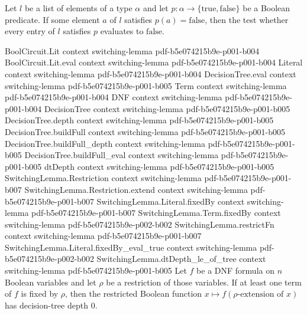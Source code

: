 \begin{lemma}
\label{SwitchingLemma.list_all_eq_false_of_mem}
\leanok
{}
Let $l$ be a list of elements of a type $\alpha$ and let $p \colon \alpha \to
\{\mathrm{true}, \mathrm{false}\}$ be a Boolean predicate. If some element $a$ of $l$
satisfies $p(a) = \mathrm{false}$, then the test whether every entry of $l$ satisfies
$p$ evaluates to $\mathrm{false}$.
\end{lemma}

\begin{lemma}
\label{SwitchingLemma.fixedTerm_implies_dtDepth_zero}
\leanok
{}
\proofstep
  {BoolCircuit.Lit}
  {context}
  {switching-lemma}
  {pdf-b5e074215b9e-p001-b004}
\proofstep
  {BoolCircuit.Lit.eval}
  {context}
  {switching-lemma}
  {pdf-b5e074215b9e-p001-b004}
\proofstep
  {Literal}
  {context}
  {switching-lemma}
  {pdf-b5e074215b9e-p001-b004}
\proofstep
  {DecisionTree.eval}
  {context}
  {switching-lemma}
  {pdf-b5e074215b9e-p001-b005}
\proofstep
  {Term}
  {context}
  {switching-lemma}
  {pdf-b5e074215b9e-p001-b004}
\proofstep
  {DNF}
  {context}
  {switching-lemma}
  {pdf-b5e074215b9e-p001-b004}
\proofstep
  {DecisionTree}
  {context}
  {switching-lemma}
  {pdf-b5e074215b9e-p001-b005}
\proofstep
  {DecisionTree.depth}
  {context}
  {switching-lemma}
  {pdf-b5e074215b9e-p001-b005}
\proofstep
  {DecisionTree.buildFull}
  {context}
  {switching-lemma}
  {pdf-b5e074215b9e-p001-b005}
\proofstep
  {DecisionTree.buildFull_depth}
  {context}
  {switching-lemma}
  {pdf-b5e074215b9e-p001-b005}
\proofstep
  {DecisionTree.buildFull_eval}
  {context}
  {switching-lemma}
  {pdf-b5e074215b9e-p001-b005}
\proofstep
  {dtDepth}
  {context}
  {switching-lemma}
  {pdf-b5e074215b9e-p001-b005}
\proofstep
  {SwitchingLemma.Restriction}
  {context}
  {switching-lemma}
  {pdf-b5e074215b9e-p001-b007}
\proofstep
  {SwitchingLemma.Restriction.extend}
  {context}
  {switching-lemma}
  {pdf-b5e074215b9e-p001-b007}
\proofstep
  {SwitchingLemma.Literal.fixedBy}
  {context}
  {switching-lemma}
  {pdf-b5e074215b9e-p001-b007}
\proofstep
  {SwitchingLemma.Term.fixedBy}
  {context}
  {switching-lemma}
  {pdf-b5e074215b9e-p002-b002}
\proofstep
  {SwitchingLemma.restrictFn}
  {context}
  {switching-lemma}
  {pdf-b5e074215b9e-p001-b007}
\proofstep
  {SwitchingLemma.Literal.fixedBy_eval_true}
  {context}
  {switching-lemma}
  {pdf-b5e074215b9e-p002-b002}
\proofstep
  {SwitchingLemma.dtDepth_le_of_tree}
  {context}
  {switching-lemma}
  {pdf-b5e074215b9e-p001-b005}
Let $f$ be a DNF formula on $n$ Boolean variables and let $\rho$ be a restriction of
those variables. If at least one term of $f$ is fixed by $\rho$, then the restricted
Boolean function $x \mapsto f(\rho\text{-extension of }x)$ has decision-tree depth $0$.
\end{lemma}

